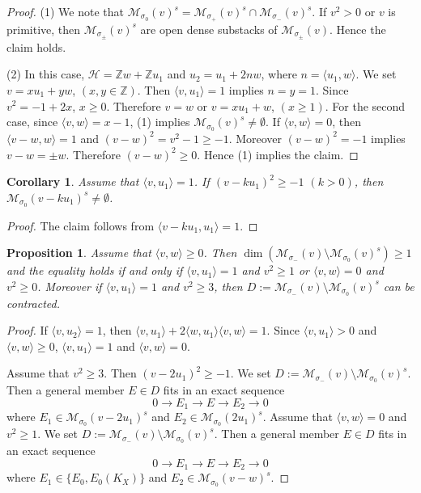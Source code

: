 \documentclass[leqno,11pt]{amsart}
\def\Z{\ensuremath{\mathbb{Z}}}
\def\dim{\mathop{\mathrm{dim}}\nolimits}
\newtheorem{Prop}[Thm]{Proposition}
\newtheorem{Cor}[Thm]{Corollary}
\theoremstyle{definition}
\def\Z{\ensuremath{\mathbb{Z}}}
\def\HH{\ensuremath{\mathcal H}}
\def\MM{\ensuremath{\mathcal M}}
\begin{document}
\begin{proof}
(1)
We note that $\MM_{\sigma_0}(v)^s=
\MM_{\sigma_+}(v)^s \cap \MM_{\sigma_-}(v)^s$.
If $v^2>0$ or $v$ is primitive, 
then $\MM_{\sigma_\pm}(v)^s$ are open dense substacks
of $\MM_{\sigma_\pm}(v)$. Hence the claim holds.

(2)
In this case, $\HH=\Z w+\Z u_1$ and $u_2=u_1+2n w$, where
$n=\langle u_1,w \rangle$.
We set $v=x u_1+y w$, $(x,y \in \Z)$.
Then $\langle v,u_1 \rangle=1$ implies
$n=y=1$. Since $v^2=-1+2x$,
$x \geq 0$. Therefore $v=w$ or $v=x u_1+w$, $(x \geq 1)$.
For the second case,
since $\langle v,w \rangle=x-1$,
(1) implies
 $\MM_{\sigma_0}(v)^s \ne \emptyset$.
If $\langle v,w \rangle=0$, then $\langle v-w,w \rangle=1$ and
$(v-w)^2=v^2-1 \geq -1$. 
Moreover $(v-w)^2=-1$ implies $v-w =\pm w$. 
Therefore $(v-w)^2 \geq 0$. 
Hence (1) implies the claim.
\end{proof}

\begin{Cor}
Assume that $\langle v,u_1 \rangle=1$.
If $(v-k u_1)^2 \geq -1$ $(k>0)$, then
$\MM_{\sigma_0}(v-k u_1)^s \ne \emptyset$.
\end{Cor}

\begin{proof}
The claim follows from $\langle v-k u_1,u_1 \rangle=1$.
\end{proof}


\begin{Prop}
Assume that $\langle v,w \rangle \geq 0$.
Then $\dim(\MM_{\sigma_-}(v) \setminus \MM_{\sigma_0}(v)^s) \geq 1$
and the equality holds if and only if 
$\langle v,u_1 \rangle=1$ and $v^2 \geq 1$ or
$\langle v,w \rangle=0$ and $v^2 \geq 0$.
Moreover if $\langle v,u_1 \rangle=1$ and $v^2 \geq 3$, then
$D:=\MM_{\sigma_-}(v) \setminus \MM_{\sigma_0}(v)^s$
can be contracted.
\end{Prop}

\begin{proof}
If $\langle v,u_2 \rangle=1$, then
$\langle v,u_1 \rangle+2\langle w,u_1 \rangle \langle v,w \rangle=1$.
Since $\langle v,u_1 \rangle > 0$ and $\langle v,w \rangle \geq 0$,
$\langle v,u_1 \rangle=1$ and $\langle v,w \rangle=0$.

Assume that $v^2 \geq 3$. Then $(v-2u_1)^2 \geq -1$.
We set $D:=\MM_{\sigma_-}(v) \setminus \MM_{\sigma_0}(v)^s$.
Then a general member $E \in D$ fits in an exact sequence
\begin{equation}
0 \to E_1 \to E \to E_2 \to 0
\end{equation}
where $E_1 \in \MM_{\sigma_0}(v-2u_1)^s$ and 
$E_2 \in \MM_{\sigma_0}(2u_1)^s$.
Assume that $\langle v,w \rangle=0$ and $v^2 \geq 1$.
We set $D:=\MM_{\sigma_-}(v) \setminus \MM_{\sigma_0}(v)^s$.
Then a general member $E \in D$ fits in an exact sequence
\begin{equation}
0 \to E_1 \to E \to E_2 \to 0
\end{equation}
where $E_1 \in \{ E_0, E_0(K_X) \}$ and 
$E_2 \in \MM_{\sigma_0}(v-w)^s$.
\end{proof}
\end{document}
